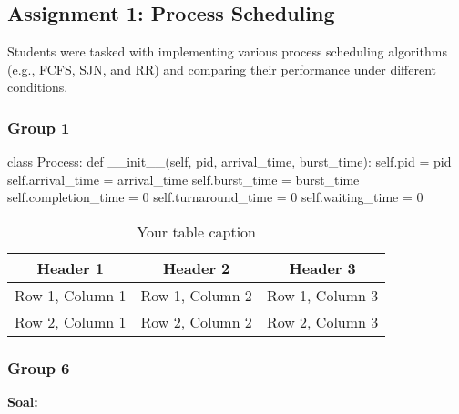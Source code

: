 \documentclass[12pt]{article}
\begin{document}
\subsection{Assignment 1: Process Scheduling}
Students were tasked with implementing various process scheduling algorithms (e.g., FCFS, SJN, and RR) and comparing their performance under different conditions.
\subsubsection{Group 1}
\begin{python}
    class Process:
    def __init__(self, pid, arrival_time, burst_time):
        self.pid = pid
        self.arrival_time = arrival_time
        self.burst_time = burst_time
        self.completion_time = 0
        self.turnaround_time = 0
        self.waiting_time = 0
\end{python}

\begin{table}[htbp] %
    \centering
    \begin{tabular}{|c|c|c|} %
    \hline
    Header 1 & Header 2 & Header 3 \\ %
    \hline
    Row 1, Column 1 & Row 1, Column 2 & Row 1, Column 3 \\ %
    \hline
    Row 2, Column 1 & Row 2, Column 2 & Row 2, Column 3 \\ %
    \hline
    \end{tabular}
    \caption{Your table caption} %
    \label{tab:your_label} %
\end{table}

\subsubsection{Group 6}
\textbf{Soal:}
\end{document}
